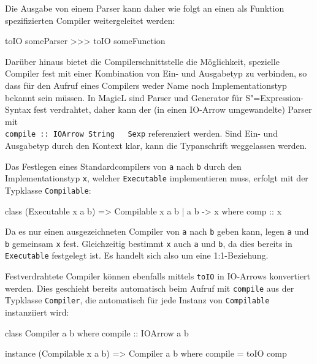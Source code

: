 \documentclass[12pt, a4paper, bibgerm]{scrbook}
\newenvironment{DIFnomarkup}{}{}
\newcommand\icode[1]{\lstinline?#1?}
\newcommand{\sexp}{S"=Expression}
\begin{document}
Die Ausgabe von einem Parser kann daher wie folgt an einen als
Funktion spezifizierten Compiler weitergeleitet werden:
\begin{code}
toIO someParser >>> toIO someFunction
\end{code}

Darüber hinaus bietet die Compilerschnittstelle die Möglichkeit,
spezielle Compiler fest mit einer Kombination von Ein- und Ausgabetyp zu
verbinden, so dass für den Aufruf eines Compilers weder Name noch
Implementationstyp bekannt sein müssen. In MagicL sind Parser und
Generator für \sexp{}-Syntax fest verdrahtet, daher kann der (in einen
IO-Arrow umgewandelte) Parser mit \\ \icode{compile :: IOArrow String
  Sexp} referenziert werden. Sind Ein- und Ausgabetyp durch den Kontext
klar, kann die Typanschrift weggelassen werden.

Das Festlegen eines Standardcompilers von \icode{a} nach \icode{b} durch
den Implementationstyp \icode{x}, welcher \icode{Executable}
implementieren muss, erfolgt mit der Typklasse \icode{Compilable}:
\begin{DIFnomarkup}\begin{code}
class (Executable x a b) => Compilable x a b | a b -> x where
  comp :: x
\end{code}\end{DIFnomarkup}
Da es nur einen ausgezeichneten Compiler von \icode{a} nach \icode{b}
geben kann, legen \icode{a} und \icode{b} gemeinsam \icode{x}
fest. Gleichzeitig bestimmt \icode{x} auch \icode{a} und \icode{b}, da
dies bereits in \icode{Executable} festgelegt ist. Es handelt sich also
um eine 1:1-Beziehung.

Festverdrahtete Compiler können ebenfalls mittels \icode{toIO} in
IO-Arrows konvertiert werden. Dies geschieht bereits automatisch beim
Aufruf mit \icode{compile} aus der Typklasse \icode{Compiler}, die
automatisch für jede Instanz von \icode{Compilable} instanziiert wird:
\begin{DIFnomarkup}\begin{code}
class Compiler a b where
  compile :: IOArrow a b

instance (Compilable x a b) => Compiler a b where
  compile = toIO comp
\end{code}\end{DIFnomarkup}
\end{document}
